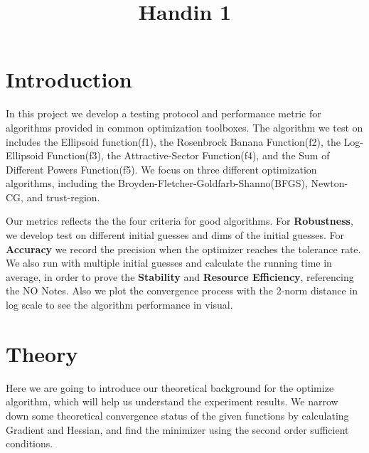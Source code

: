 \documentclass[12pt]{article}
\title{Handin 1}
\begin{document}
\maketitle

\section{Introduction}

In this project we develop a testing protocol and performance metric for algorithms provided in common optimization toolboxes. The algorithm we test on includes the Ellipsoid function(f1), the Rosenbrock Banana Function(f2), the Log-Ellipsoid Function(f3), the Attractive-Sector Function(f4), and the Sum of Different Powers Function(f5). We focus on three different optimization algorithms, including the Broyden-Fletcher-Goldfarb-Shanno(BFGS), Newton-CG, and trust-region.

Our metrics reflects the the four criteria for good algorithms. For \textbf{Robustness}, we develop test on different initial guesses and dims of the initial guesses. For \textbf{Accuracy} we record the precision when the optimizer reaches the tolerance rate. We also run with multiple initial guesses and calculate the running time in average, in order to prove the \textbf{Stability} and \textbf{Resource Efficiency}, referencing the NO Notes. %
Also we plot the convergence process with the 2-norm distance in log scale to see the algorithm performance in visual. 


\section{Theory}


Here we are going to introduce our theoretical background for the optimize algorithm, which will help us understand the experiment results. We narrow down some theoretical convergence status of the given functions by calculating Gradient and Hessian, and find the minimizer using the second order sufficient conditions. 
\end{document}
